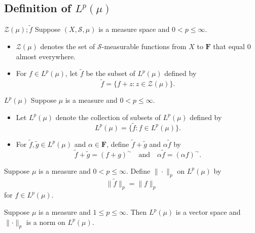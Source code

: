 \documentclass[../main.tex]{subfiles}
\begin{document}
\subsection*{Definition of \(  L^{p}  \left( \mu  \right) \) }

\begin{definition}{\(  \mathcal{Z}(\mu);\tilde{f}  \) }{}
Suppose \((X,\mathcal{S},\mu)\) is a measure space and \(0<p\leq\infty\).

\begin{itemize}
\item \(\mathcal{Z}(\mu)\) denotes the set of \(\mathcal{S}\)-measurable functions from \(X\) to \(\mathbf{F}\) that equal \(0\) almost everywhere.
\item For \(f\in L^{p}(\mu)\), let \(\tilde{f}\) be the subset of \(L^{p}(\mu)\) defined by
\[
\tilde{f}=\{f+z:z\in\mathcal{Z}(\mu)\}.
\]
\end{itemize}
\end{definition}

\begin{definition}{\(L^{p}(\mu)\)}{}
Suppose \(\mu\) is a measure and \(0<p\leq\infty\).

\begin{itemize}
\item Let \(L^{p}(\mu)\) denote the collection of subsets of \(L^{p}(\mu)\) defined by
\[
L^{p}(\mu)=\{\tilde{f}:f\in L^{p}(\mu)\}.
\]

\item For \(\tilde{f},\tilde{g}\in L^{p}(\mu)\) and \(\alpha\in\mathbf{F}\), define \(\tilde{f}+\tilde{g}\) and \(\alpha\tilde{f}\) by
\[
\tilde{f}+\tilde{g}=(f+g)^{\sim}\quad\text{and}\quad \alpha\tilde{f}=(\alpha f)^{\sim}.
\]
\end{itemize}
\end{definition}

\begin{definition}{}{}
Suppose $\mu$ is a measure and $0<p\leq\infty$. Define $\|\cdot\|_{p}$ on $L^{p}(\mu)$ by
\[
\|\tilde{f}\|_{p}=\|f\|_{p}
\]
for $f\in L^{p}(\mu)$.
\end{definition}

\begin{theorem}{}{}
Suppose $\mu$ is a measure and $1 \le p \le \infty$. Then $L^p(\mu)$ is a vector space and $\lVert \cdot \rVert_p$ is a norm on $L^p(\mu)$.
\end{theorem}
\end{document}
